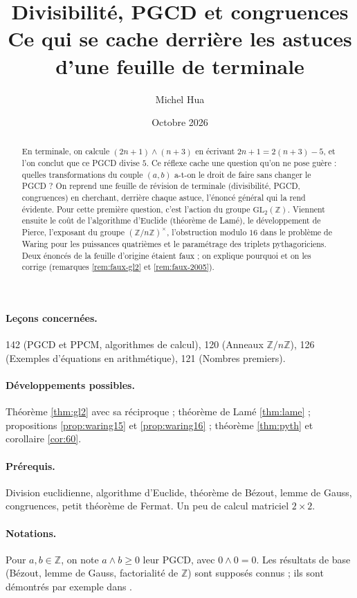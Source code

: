 \documentclass[11pt,a4paper]{article}
\title{Divisibilité, PGCD et congruences\\[2pt]
\large Ce qui se cache derrière les astuces d'une feuille de terminale}
\author{Michel Hua}
\date{Octobre 2026}
\theoremstyle{plain}
\theoremstyle{definition}
\theoremstyle{remark}
\newcommand{\Z}{\mathbb{Z}}
\newcommand{\GL}{\mathrm{GL}}
\newcommand{\pgcd}{\wedge}
\begin{document}
\maketitle

\begin{abstract}
En terminale, on calcule $(2n+1)\pgcd(n+3)$ en écrivant $2n+1=2(n+3)-5$, et l'on conclut que ce PGCD divise $5$. Ce réflexe cache une question qu'on ne pose guère : quelles transformations du couple $(a,b)$ a-t-on le droit de faire sans changer le PGCD ? On reprend une feuille de révision de terminale (divisibilité, PGCD, congruences) en cherchant, derrière chaque astuce, l'énoncé général qui la rend évidente. Pour cette première question, c'est l'action du groupe $\GL_2(\Z)$. Viennent ensuite le coût de l'algorithme d'Euclide (théorème de Lamé), le développement de Pierce, l'exposant du groupe $(\Z/n\Z)^\times$, l'obstruction modulo $16$ dans le problème de Waring pour les puissances quatrièmes et le paramétrage des triplets pythagoriciens. Deux énoncés de la feuille d'origine étaient faux ; on explique pourquoi et on les corrige (remarques \ref{rem:faux-gl2} et \ref{rem:faux-2005}).
\end{abstract}

\paragraph{Leçons concernées.} 142 (PGCD et PPCM, algorithmes de calcul), 120 (Anneaux $\Z/n\Z$), 126 (Exemples d'équations en arithmétique), 121 (Nombres premiers).

\paragraph{Développements possibles.} Théorème \ref{thm:gl2} avec sa réciproque ; théorème de Lamé \ref{thm:lame} ; propositions \ref{prop:waring15} et \ref{prop:waring16} ; théorème \ref{thm:pyth} et corollaire \ref{cor:60}.

\paragraph{Prérequis.} Division euclidienne, algorithme d'Euclide, théorème de Bézout, lemme de Gauss, congruences, petit théorème de Fermat. Un peu de calcul matriciel $2\times2$.

\paragraph{Notations.} Pour $a,b\in\Z$, on note $a\pgcd b\geq 0$ leur PGCD, avec $0\pgcd 0=0$. Les résultats de base (Bézout, lemme de Gauss, factorialité de $\Z$) sont supposés connus ; ils sont démontrés par exemple dans \cite{gourdon}.
\end{document}
